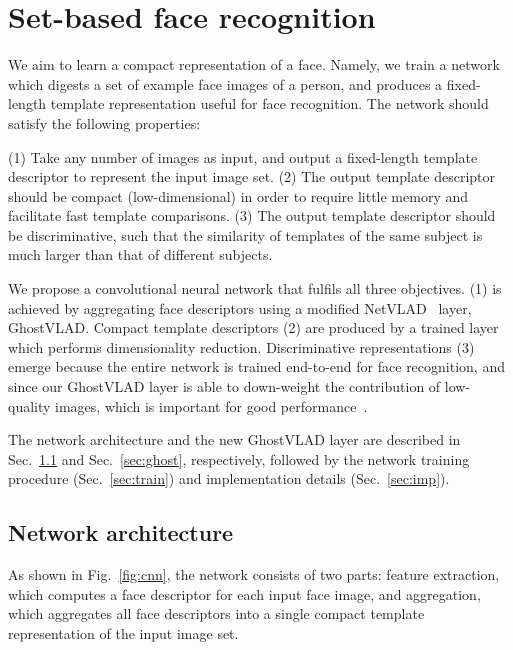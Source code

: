 \documentclass[runningheads]{llncs}
\begin{document}
%
\section{Set-based face recognition}
\label{sec:cnn}
We aim to learn a compact representation of a face.
Namely, we train a network which digests a set of example face images of
a person, and produces a fixed-length template representation
useful for face recognition.
The network should satisfy the following properties:

(1) Take any number of images as input, and output a 
fixed-length template descriptor to represent the 
input image set.
(2) The output template descriptor should be compact
(\ie low-dimensional) in order to require little memory
and facilitate fast template comparisons.
(3) The output template descriptor should be 
discriminative, such that the similarity of
templates of the same subject is much larger than that
of different subjects.

We propose a convolutional neural 
network that fulfils all three objectives.
(1) is achieved by aggregating face descriptors
using a modified NetVLAD~\cite{Arandjelovic16} layer, GhostVLAD.
Compact template descriptors (2) are produced by a
trained layer which performs dimensionality reduction.
Discriminative representations (3) emerge because
the entire network is trained end-to-end for face recognition,
and since our GhostVLAD layer is able to
down-weight the contribution of low-quality images,
which is important for good
performance~\cite{Goswami14,Yang17,Hassner16}.

The network architecture and the new GhostVLAD layer
are described
in Sec.~\ref{sec:arch} and Sec.~\ref{sec:ghost}, respectively,
followed by 
the network training procedure (Sec.~\ref{sec:train})
and implementation 
details (Sec.~\ref{sec:imp}).


\subsection{Network architecture}
\label{sec:arch}
As shown in Fig.~\ref{fig:cnn},
the network consists of two parts:
feature extraction, which computes a 
face descriptor for each input face image, and 
aggregation, which aggregates all face descriptors
into a single compact template representation of
the input image set.
\end{document}
